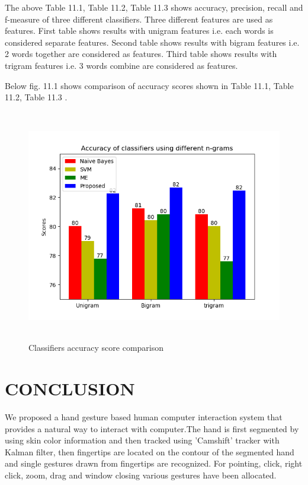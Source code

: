 \documentclass[oneside,a4paper,12pt]{pictreport}
\begin{document}
\vspace{5mm}
\par The above Table 11.1, Table 11.2, Table 11.3 shows accuracy, precision, recall and f-measure
of three different classifiers. Three different features are used as features.
First table shows results with unigram features i.e. each words is considered separate features.
Second table shows results with bigram features i.e. 2 words together are considered as features.
Third table shows results with trigram features i.e. 3 words combine are considered as features.

\vspace{5mm}
\newpage
\par Below fig. 11.1 shows comparison of accuracy scores shown in Table 11.1, Table 11.2, Table 11.3 .

\begin{figure}[!h]
\includegraphics[width=5.0in,height=4.0in]{Comparison.png}
\caption{Classifiers accuracy score comparison}
\end{figure}




\chapter{CONCLUSION}
We proposed a hand gesture based human computer
interaction system that provides a  natural  way to interact with computer.The hand 
is first segmented  by using skin color information and then tracked using 'Camshift'
tracker with Kalman filter, then fingertips are located on the contour of the segmented hand
and single gestures drawn from fingertips are recognized. For  pointing, click, right click, 
zoom, drag and window closing various gestures have been allocated.
\end{document}
